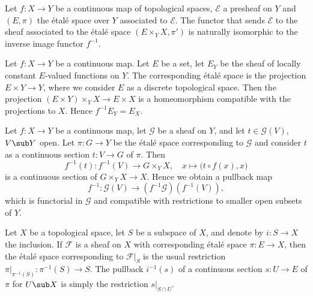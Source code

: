 \begin{proposition}
Let $f:X\to Y$ be a continuous map of topological spaces, $\mathscr{E}$ a presheaf on $Y$ and $(E,\pi)$ the étalé space over $Y$ associated to $\mathscr{E}$. The functor that sends $\mathscr{E}$ to the sheaf associated to the étalé space $(E\times_YX,\pi')$ is naturally isomorphic to the inverse image functor $f^{-1}$.
\end{proposition}
\begin{example}
Let $f:X\to Y$ be a continuous map. Let $E$ be a set, let $E_Y$ be the sheaf of locally constant $E$-valued functions on $Y$. The corresponding étalé space is the projection $E\times Y\to Y$, where we consider $E$ as a discrete topological space. Then the projection $(E\times Y)\times_YX\to E\times X$ is a homeomorphism compatible with the projections to $X$. Hence $f^{-1}E_Y=E_X$.
\end{example}
\begin{definition}
Let $f:X\to Y$ be a continuous map, let $\mathscr{G}$ be a sheaf on $Y$, and let $t\in\mathscr{G}(V)$, $V\sub Y$ open. Let $\pi:G\to Y$ be the étalé space corresponding to $\mathscr{G}$ and consider $t$ as a continuous section $t:V\to G$ of $\pi$. Then
\[f^{-1}(t):f^{-1}(V)\to G\times_YX,\quad x\mapsto\big(t\circ f(x),x\big)\]
is a continuous section of $G\times_YX\to X$. Hence we obtain a pullback map
\[f^{-1}:\mathscr{G}(V)\to(f^{-1}\mathscr{G})(f^{-1}(V)),\]
which is functorial in $\mathscr{G}$ and compatible with restrictions to smaller open subsets of $Y$.
\end{definition}
\begin{example}
Let $X$ be a topological space, let $S$ be a subspace of $X$, and denote by $i:S\to X$ the inclusion. If $\mathscr{F}$ is a sheaf on $X$ with corresponding étalé space $\pi:E\to X$, then the étalé space corresponding to $\mathscr{F}|_{S}$ is the usual restriction $\pi|_{\pi^{-1}(S)}:\pi^{-1}(S)\to S$. The pullback $i^{-1}(s)$ of a continuous section $s:U\to E$ of $\pi$ for $U\sub X$ is simply the restriction $s|_{S\cap U}$.
\end{example}